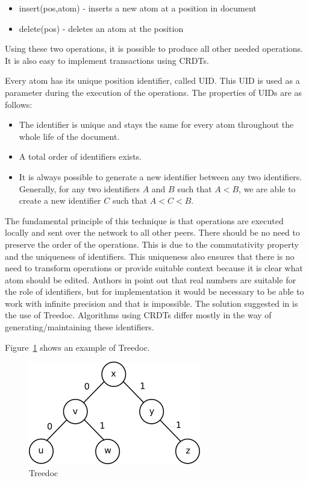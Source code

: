 \documentclass[12pt,oneside]{fithesis2}
\begin{document}
\begin{itemize}
\item insert(pos,atom) - inserts a new atom at a position in document
\item delete(pos) - deletes an atom at the position 
\end{itemize}
Using these two operations, it is possible to produce all other needed operations. It is also easy to implement transactions using CRDTs. 
\par Every atom has its unique position identifier, called UID. This UID is used as a parameter during the execution of the operations. The properties of UIDs are as follows:
\begin{itemize}
\item The identifier is unique and stays the same for every atom throughout the whole life of the document.
\item A total order of identifiers exists.
\item It is always possible to generate a new identifier between any two identifiers. Generally, for any two identifiers \(A\) and \(B\) such that \(A < B\), we are able to create a new identifier \(C\) such that \(A < C < B\).
\end{itemize}
\par The fundamental principle of this technique is that operations are executed locally and sent over the network to all other peers. There should be no need to preserve the order of the operations. This is due to the commutativity property and the uniqueness of identifiers. This uniqueness also ensures that there is no need to transform operations or provide suitable context because it is clear what atom should be edited.
Authors in \cite{Shapiro-design} point out that real numbers are suitable for the role of identifiers, but for implementation it would be necessary to be able to work with infinite precision and that is impossible. The solution suggested in \cite{Shapiro-design} is the use of Treedoc. Algorithms using CRDTs differ mostly in the way of generating/maintaining these identifiers.
\par Figure~\ref{fig:treedoc} shows an example of Treedoc.
\begin{figure}[H]
\caption{Treedoc}
\label{fig:treedoc}
\centering
\vspace{5mm}
\includegraphics{treedoc1} 
\end{figure}
\end{document}
